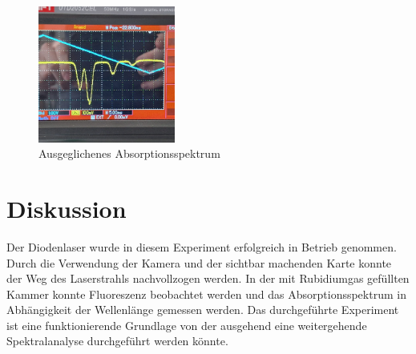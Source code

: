 \begin{figure}
    \centering
    \includegraphics[width=0.4\textwidth]{./Materialien/spektrum.jpeg}
	\caption{Ausgeglichenes Absorptionsspektrum}\label{fig:spektrum}
\end{figure}


\section{Diskussion}
Der Diodenlaser wurde in diesem Experiment erfolgreich in Betrieb genommen.
Durch die Verwendung der Kamera und der sichtbar machenden Karte konnte der Weg des Laserstrahls nachvollzogen werden.
In der mit Rubidiumgas gefüllten Kammer konnte Fluoreszenz beobachtet werden und das Absorptionsspektrum in Abhängigkeit
der Wellenlänge gemessen werden.
Das durchgeführte Experiment ist eine funktionierende Grundlage von der ausgehend
 eine weitergehende Spektralanalyse durchgeführt werden könnte. 



\printbibliography


